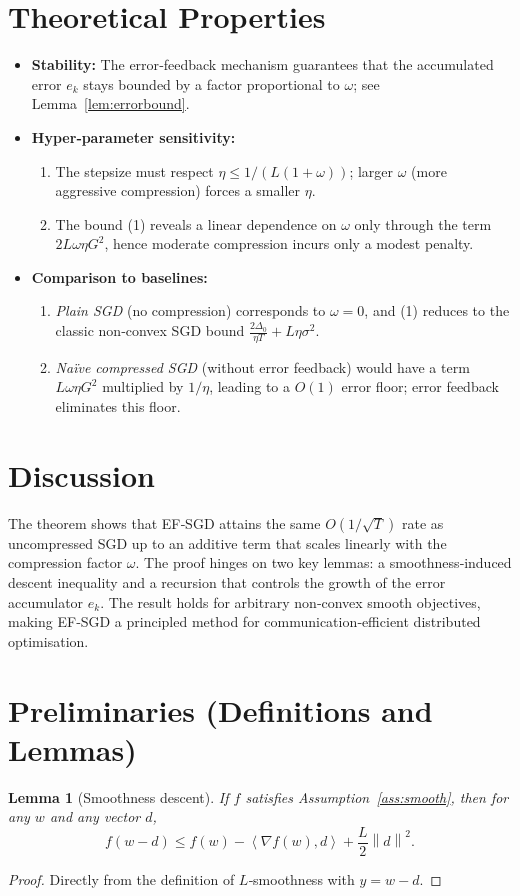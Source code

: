 \documentclass{article}
\newtheorem{lemma}{Lemma}
\newcommand{\norm}[1]{\left\lVert #1\right\rVert}
\newcommand{\ip}[2]{\left\langle #1,#2\right\rangle}
\begin{document}
\section*{Theoretical Properties}
\begin{itemize}
\item \textbf{Stability:} The error‑feedback mechanism guarantees that the accumulated error $e_k$ stays bounded
by a factor proportional to $\omega$; see Lemma~\ref{lem:errorbound}.
\item \textbf{Hyper‑parameter sensitivity:}
\begin{enumerate}[label=(\alph*)]
\item The stepsize must respect $\eta\le 1/(L(1+\omega))$; larger $\omega$ (more aggressive compression)
forces a smaller $\eta$.
\item The bound (1) reveals a linear dependence on $\omega$ only through the term $2L\omega\eta G^2$,
hence moderate compression incurs only a modest penalty.
\end{enumerate}
\item \textbf{Comparison to baselines:}
\begin{enumerate}[label=(\alph*)]
\item \emph{Plain SGD} (no compression) corresponds to $\omega=0$, and (1) reduces to the classic
non‑convex SGD bound $\frac{2\Delta_0}{\eta T}+L\eta\sigma^2$.
\item \emph{Naïve compressed SGD} (without error feedback) would have a term $L\omega\eta G^2$ multiplied by $1/\eta$,
leading to a $O(1)$ error floor; error feedback eliminates this floor.
\end{enumerate}
\end{itemize}

\section*{Discussion}
The theorem shows that EF‑SGD attains the same $O(1/\sqrt{T})$ rate as uncompressed SGD up to an additive
term that scales linearly with the compression factor $\omega$.  The proof hinges on two key lemmas:
a smoothness‑induced descent inequality and a recursion that controls the growth of the error
accumulator $e_k$.  The result holds for arbitrary non‑convex smooth objectives, making EF‑SGD a
principled method for communication‑efficient distributed optimisation.

\newpage
\section*{Preliminaries (Definitions and Lemmas)}
\begin{lemma}[Smoothness descent]\label{lem:smooth}
If $f$ satisfies Assumption~\ref{ass:smooth}, then for any $w$ and any vector $d$,
\[
f(w-d)\le f(w)-\ip{\nabla f(w)}{d}+\frac{L}{2}\norm{d}^2 .
\]
\end{lemma}
\begin{proof}
Directly from the definition of $L$‑smoothness with $y=w-d$.
\end{proof}
\end{document}
